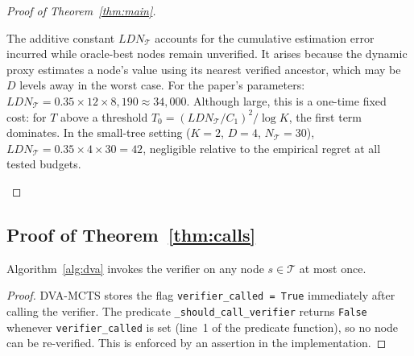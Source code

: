 \begin{proof}[Proof of Theorem~\ref{thm:main}]
\begin{remark}
\label{rem:LDN_T}
The additive constant $LDN_{\mathcal{T}}$ accounts for the cumulative estimation
error incurred while oracle-best nodes remain unverified.  It arises because
the dynamic proxy estimates a node's value using its nearest verified ancestor,
which may be $D$ levels away in the worst case.  For the paper's parameters:
$LDN_{\mathcal{T}} = 0.35 \times 12 \times 8{,}190 \approx 34{,}000$.
Although large, this is a one-time fixed cost: for $T$ above a threshold
$T_0 = (LDN_{\mathcal{T}}/C_1)^2/\log K$, the first term dominates.  In the
small-tree setting ($K{=}2$, $D{=}4$, $N_{\mathcal{T}}{=}30$),
$LDN_{\mathcal{T}} = 0.35 \times 4 \times 30 = 42$, negligible relative to the
empirical regret at all tested budgets.
\end{remark}

\end{proof}

\subsection{Proof of Theorem~\ref{thm:calls}}
\label{app:calls}

\begin{lemma}
\label{lem:single_verify}
Algorithm~\ref{alg:dva} invokes the verifier on any node $s \in \mathcal{T}$
at most once.
\end{lemma}

\begin{proof}
DVA-MCTS stores the flag \texttt{verifier\_called = True} immediately after
calling the verifier.  The predicate \texttt{\_should\_call\_verifier} returns
\texttt{False} whenever \texttt{verifier\_called} is set (line~1 of the predicate
function), so no node can be re-verified.  This is enforced by an assertion
in the implementation.
\end{proof}

